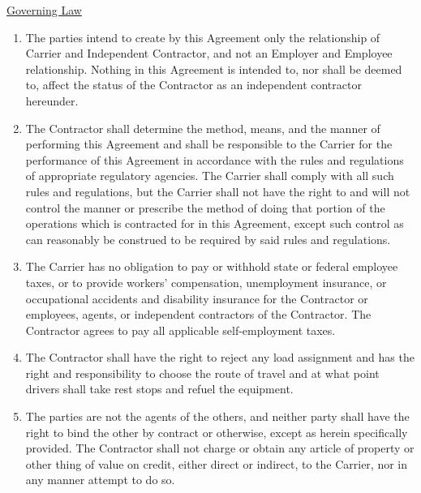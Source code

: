 \underline{Governing Law}
\begin{enumerate}
    \item The parties intend to create by this Agreement only the
    relationship of Carrier and Independent Contractor, and not an Employer
    and Employee relationship. Nothing in this Agreement is intended to,
    nor shall be deemed to, affect the status of the Contractor as an
    independent contractor hereunder.

    \item The Contractor shall determine the method, means, and the manner
    of performing this Agreement and shall be responsible to the Carrier
    for the performance of this Agreement in accordance with the rules and
    regulations of appropriate regulatory agencies. The Carrier shall
    comply with all such rules and regulations, but the Carrier shall not
    have the right to and will not control the manner or prescribe the
    method of doing that portion of the operations which is contracted for
    in this Agreement, except such control as can reasonably be construed
    to be required by said rules and regulations.

    \item The Carrier has no obligation to pay or withhold state or federal
    employee taxes, or to provide workers' compensation, unemployment
    insurance, or occupational accidents and disability insurance for the
    Contractor or employees, agents, or independent contractors of the
    Contractor. The Contractor agrees to pay all applicable self-employment
    taxes.

    \item The Contractor shall have the right to reject any load assignment
    and has the right and responsibility to choose the route of travel and
    at what point drivers shall take rest stops and refuel the equipment.

    \item The parties are not the agents of the others, and neither party
    shall have the right to bind the other by contract or otherwise, except
    as herein specifically provided. The Contractor shall not charge or
    obtain any article of property or other thing of value on credit,
    either direct or indirect, to the Carrier, nor in any manner attempt to
    do so.
\end{enumerate}